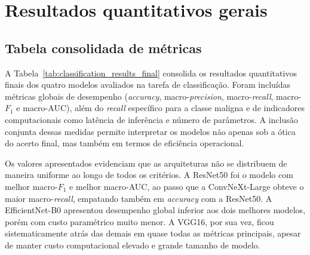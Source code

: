 \documentclass[tcc,capa]{texufpel}
\begin{document}
\section{Resultados quantitativos gerais}

\subsection{Tabela consolidada de métricas}

A Tabela~\ref{tab:classification_results_final} consolida os resultados quantitativos finais dos quatro modelos avaliados na tarefa de classificação. Foram incluídas métricas globais de desempenho (\textit{accuracy}, macro-\textit{precision}, macro-\textit{recall}, macro-\(F_1\) e macro-AUC), além do \textit{recall} específico para a classe maligna e de indicadores computacionais como latência de inferência e número de parâmetros. A inclusão conjunta dessas medidas permite interpretar os modelos não apenas sob a ótica do acerto final, mas também em termos de eficiência operacional.

\begin{table}[htbp]
	\centering
	\caption{Resultados consolidados dos modelos de classificação no conjunto de teste.}
	\label{tab:classification_results_final}
\end{table}

Os valores apresentados evidenciam que as arquiteturas não se distribuem de maneira uniforme ao longo de todos os critérios. A ResNet50 foi o modelo com melhor macro-\(F_1\) e melhor macro-AUC, ao passo que a ConvNeXt-Large obteve o maior macro-\textit{recall}, empatando também em \textit{accuracy} com a ResNet50. A EfficientNet-B0 apresentou desempenho global inferior aos dois melhores modelos, porém com custo paramétrico muito menor. A VGG16, por sua vez, ficou sistematicamente atrás das demais em quase todas as métricas principais, apesar de manter custo computacional elevado e grande tamanho de modelo.
\end{document}
